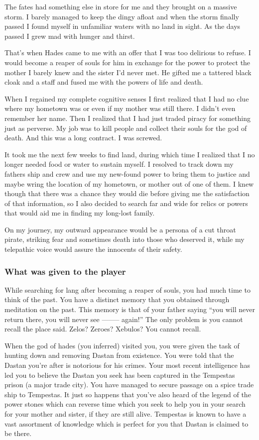 The fates had something else in store for me and they brought on a massive storm. I barely managed to keep the dingy afloat and when the storm finally passed I found myself in unfamiliar waters with no land in sight. As the days passed I grew mad with hunger and thirst. 

That’s when Hades came to me with an offer that I was too delirious to refuse. I would become a reaper of souls for him in exchange for the power to protect the mother I barely knew and the sister I’d never met. He gifted me a tattered black cloak and a staff and fused me with the powers of life and death.

When I regained my complete cognitive senses I first realized that I had no clue where my hometown was or even if my mother was still there. I didn't even remember her name. Then I realized that I had just traded piracy for something just as perverse. My job was to kill people and collect their souls for the god of death. And this was a long contract. I was screwed.

It took me the next few weeks to find land, during which time I realized that I no longer needed food or water to sustain myself. I resolved to track down my fathers ship and crew and use my new-found power to bring them to justice and maybe wring the location of my hometown, or mother out of one of them. I knew though that there was a chance they would die before giving me the satisfaction of that information, so I also decided to search far and wide for relics or powers that would aid me in finding my long-lost family. 

On my journey, my outward appearance would be a persona of a cut throat pirate, striking fear and sometimes death into those who deserved it, while my telepathic voice would assure the innocents of their safety. 

\subsubsection{What was given to the player}

While searching for lang after becoming a reaper of souls, you had much time to think of the past. You have a distinct memory that you obtained through meditation on the past. This memory is that of your father saying ``you will never return there, you will never see -------- again!'' The only problem is you cannot recall the place said. Zelos? Zeroes? Xebulos? You cannot recall.

When the god of hades (you inferred) visited you, you were given the task of hunting down and removing Dastan from existence. You were told that the Dastan you're after is notorious for his crimes. Your most recent intelligence has led you to believe the Dastan you seek has been captured in the Tempestas prison (a major trade city). You have managed to secure passage on a spice trade ship to Tempestas. It just so happens that you've also heard of the legend of the power stones which can reverse time which you seek to help you in your search for your mother and sister, if they are still alive. Tempestas is known to have a vast assortment of knowledge which is perfect for you that Dastan is claimed to be there.

